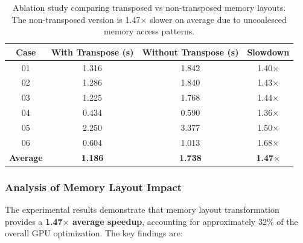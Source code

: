\documentclass{article}
\begin{document}
\begin{table}[H]
\centering
\small
\begin{tabular}{cccc}
\toprule
\textbf{Case} & \textbf{With Transpose (s)} & \textbf{Without Transpose (s)} & \textbf{Slowdown} \\
\midrule
01 & 1.316 & 1.842 & 1.40$\times$ \\
02 & 1.286 & 1.840 & 1.43$\times$ \\
03 & 1.225 & 1.768 & 1.44$\times$ \\
04 & 0.434 & 0.590 & 1.36$\times$ \\
05 & 2.250 & 3.377 & 1.50$\times$ \\
06 & 0.604 & 1.013 & 1.68$\times$ \\
\midrule
\textbf{Average} & \textbf{1.186} & \textbf{1.738} & \textbf{1.47$\times$} \\
\bottomrule
\end{tabular}
\caption{Ablation study comparing transposed vs non-transposed memory layouts. The non-transposed version is 1.47$\times$ slower on average due to uncoalesced memory access patterns.}
\label{tab:transpose_ablation}
\end{table}

\subsubsection{Analysis of Memory Layout Impact}

The experimental results demonstrate that memory layout transformation provides a \textbf{1.47$\times$ average speedup}, accounting for approximately 32\% of the overall GPU optimization. The key findings are:
\end{document}
